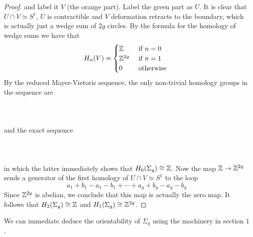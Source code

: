 \documentclass[a4paper]{article}
\begin{document}
\begin{prp}{}{}
\begin{proof}
and label it $V$ (the orange part). Label the green part as $U$. It is clear that $U\cap V\simeq S^1$, $U$ is contractible and $V$ deformation retracts to the boundary, which is actually just a wedge sum of $2g$ circles. By the formula for the homology of wedge sums we have that $$H_n(V)=\begin{cases}
\mathbb{Z} & \text{ if } n=0\\
\mathbb{Z}^{2g} & \text{ if } n=1\\
0 & \text{ otherwise }
\end{cases}$$ By the reduced Mayer-Vietoris sequence, the only non-trivial homology groups in the sequence are \\~\\
\\~\\
and the exact sequence \\~\\
\\~\\
in which the latter immediately shows that $H_0(\Sigma_g)\cong\mathbb{Z}$. Now the map $\mathbb{Z}\to\mathbb{Z}^{2g}$ sends a generator of the first homology of $U\cap V\simeq S^1$ to the loop $$a_1+b_1-a_1-b_1+\cdots+a_g+b_g-a_g-b_g$$ Since $\mathbb{Z}^{2g}$ is abelian, we conclude that this map is actually the zero map. It follows that $H_2(\Sigma_g)\cong\mathbb{Z}$ and $H_1(\Sigma_g)\cong\mathbb{Z}^{2g}$. 
\end{proof}
\end{prp}

We can immediate deduce the orientability of $\Sigma_g$ using the machinery in section $1$. 
\end{document}
